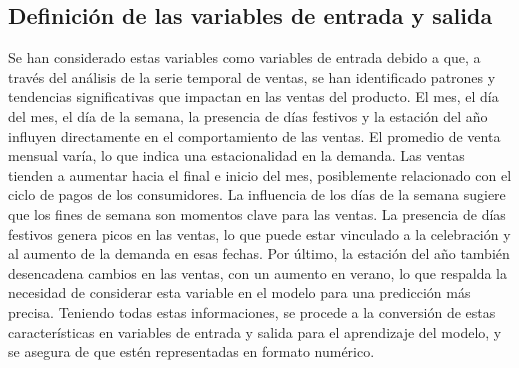 


\subsection{Definición de las variables de entrada y salida}

Se han considerado estas variables como variables de entrada debido a que, a través del análisis de la serie temporal de ventas, se han identificado patrones y tendencias significativas que impactan en las ventas del producto. El mes, el día del mes, el día de la semana, la presencia de días festivos y la estación del año influyen directamente en el comportamiento de las ventas. El promedio de venta mensual varía, lo que indica una estacionalidad en la demanda. Las ventas tienden a aumentar hacia el final e inicio del mes, posiblemente relacionado con el ciclo de pagos de los consumidores. La influencia de los días de la semana sugiere que los fines de semana son momentos clave para las ventas. La presencia de días festivos genera picos en las ventas, lo que puede estar vinculado a la celebración y al aumento de la demanda en esas fechas. Por último, la estación del año también desencadena cambios en las ventas, con un aumento en verano, lo que respalda la necesidad de considerar esta variable en el modelo para una predicción más precisa.
\vspace{1\baselineskip}
Teniendo todas estas informaciones, se procede a la conversión de estas características en variables de entrada y salida para el aprendizaje del modelo, y se asegura de que estén representadas en formato numérico.

